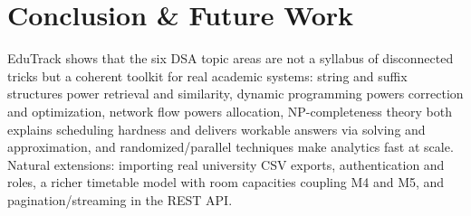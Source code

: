 \documentclass[11pt,a4paper]{article}
\begin{document}
\section{Conclusion \& Future Work}

EduTrack shows that the six DSA topic areas are not a syllabus of disconnected tricks
but a coherent toolkit for real academic systems: string and suffix structures power
retrieval and similarity, dynamic programming powers correction and optimization,
network flow powers allocation, NP-completeness theory both explains scheduling hardness
and delivers workable answers via solving and approximation, and randomized/parallel
techniques make analytics fast at scale. Natural extensions: importing real university
CSV exports, authentication and roles, a richer timetable model with room capacities
coupling M4 and M5, and pagination/streaming in the REST API.
\end{document}
